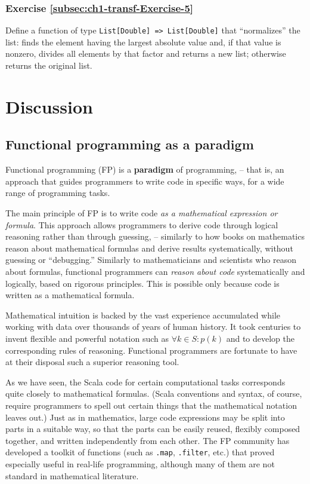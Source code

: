 \subsubsection{Exercise \label{subsec:ch1-transf-Exercise-5}\ref{subsec:ch1-transf-Exercise-5}}

Define a function of type \texttt{}\lstinline!List[Double] => List[Double]!
that ``normalizes'' the list: finds the element having the largest
absolute value and, if that value is nonzero, divides all elements
by that factor and returns a new list; otherwise returns the original
list.

\section{Discussion}

\subsection{Functional programming as a paradigm}

Functional programming (FP) is a \textbf{paradigm}
of programming, – that is, an approach that guides programmers to
write code in specific ways, for a wide range of programming tasks.

The main principle of FP is to write code \emph{as a mathematical
expression or formula}. This approach allows programmers to derive
code through logical reasoning rather than through guessing, – similarly
to how books on mathematics reason about mathematical formulas and
derive results systematically, without guessing or ``debugging.''
Similarly to mathematicians and scientists who reason about formulas,
functional programmers can \emph{reason about code} systematically
and logically, based on rigorous principles. This is possible only
because code is written as a mathematical formula.

Mathematical intuition is backed by the vast experience accumulated
while working with data over thousands of years of human history.
It took centuries to invent flexible and powerful notation such as
$\forall k\in S:p(k)$ and to develop the corresponding rules of reasoning.
Functional programmers are fortunate to have at their disposal such
a superior reasoning tool.

As we have seen, the Scala code for certain computational tasks corresponds
quite closely to mathematical formulas. (Scala conventions and syntax,
of course, require programmers to spell out certain things that the
mathematical notation leaves out.) Just as in mathematics, large code
expressions may be split into parts in a suitable way, so that the
parts can be easily reused, flexibly composed together, and written
independently from each other. The FP community has developed a toolkit
of functions (such as \lstinline!.map!,
\texttt{}\lstinline!.filter!,
etc.) that proved especially useful in real-life programming, although
many of them are not standard in mathematical literature.

